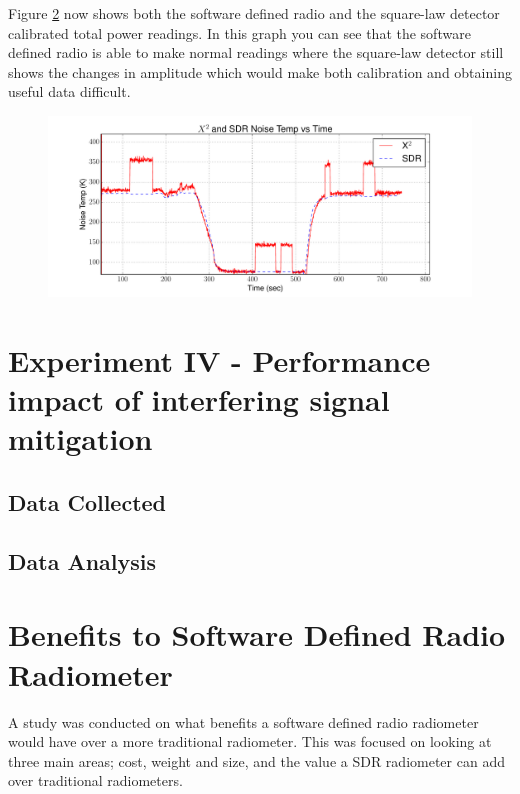 {\begin{figure}[h!tb]
\label{sdr_calib_filter}
\end{figure}

Figure \ref{filter_on} now shows both the software defined radio and the square-law detector calibrated total power readings.  In this graph you can see that the software defined radio is able to make normal readings where the square-law detector still shows the changes in amplitude which would make both calibration and obtaining useful data difficult.

\begin{figure}[h!tb] \centering

\includegraphics[width=\textwidth]{Experiments/Exp4/calib_filtered_both.pdf}

\label{filter_on}
\end{figure}

\section{Experiment IV - Performance impact of interfering signal mitigation} \label{Exp1_results}

\subsection{Data Collected}

\subsection{Data Analysis}



\section{Benefits to Software Defined Radio Radiometer}
A study was conducted on what benefits a software defined radio radiometer would have over a more traditional radiometer.  This was focused on looking at three main areas; cost, weight and size, and the value a SDR radiometer can add over traditional radiometers.

}
